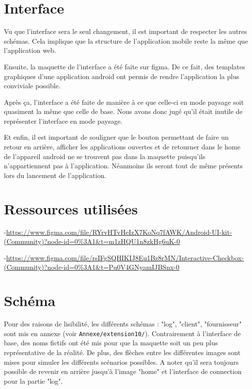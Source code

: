 \section{Interface}
\begin{flushleft}
Vu que l'interface sera le seul changement, il est important de respecter les autres schémas. Cela implique que la structure de l'application mobile reste la même que l'application web.
\end{flushleft}
\begin{flushleft}
Ensuite, la maquette de l'interface a été faite sur figma. De ce fait, des templates graphiques d'une application android ont permis de rendre l'application la plus conviviale possible.
\end{flushleft}
\begin{flushleft}
Après ça, l'interface a été faite de manière à ce que celle-ci en mode paysage soit quasiment la même que celle de base. Nous avons donc jugé qu'il était inutile de représenter l'interface en mode paysage. 
\end{flushleft}
\begin{flushleft}
Et enfin, il est important de souligner que le bouton permettant de faire un retour en arrière, afficher les applications ouvertes et de retourner dans le home de l'appareil android ne se trouvent pas dans la maquette puisqu'ils n'appartiennent pas à l'application. Néanmoins ils seront tout de même présents lors du lancement de l'application.
\end{flushleft}
\newpage
\section{Ressources utilisées}
\begin{flushleft}
-\url{https://www.figma.com/file/RYrvHTvHeIzX7KoNq7fAWK/Android-UI-kit-(Community)?node-id=0\%3A1&t=m1zHQU1n8zkHg6uK-0}
\end{flushleft}
\begin{flushleft}
-\url{https://www.figma.com/file/rsIFgSQHIKIJ8Eu1Bz8rMN/Interactive-Checkbox-(Community)?node-id=0\%3A1&t=Pu0V4GNyamIJBSnx-0}
\end{flushleft}
\section{Schéma}
\begin{flushleft}
Pour des raisons de lisibilité, les différents schémas : "log", "client", "fournisseur" sont mis en annexe (voir \texttt{Annexe/extension10/}). Contrairement à l'interface de base, des noms fictifs ont été mis pour que la maquette soit un peu plus représentative de la réalité. De plus, des flèches entre les différentes images sont mises pour simuler les différents scénarios possibles. A noter qu'il sera toujours possible de revenir en arrière jusqu'à l'image "home" et l'interface de connection pour la partie "log".
\end{flushleft}
